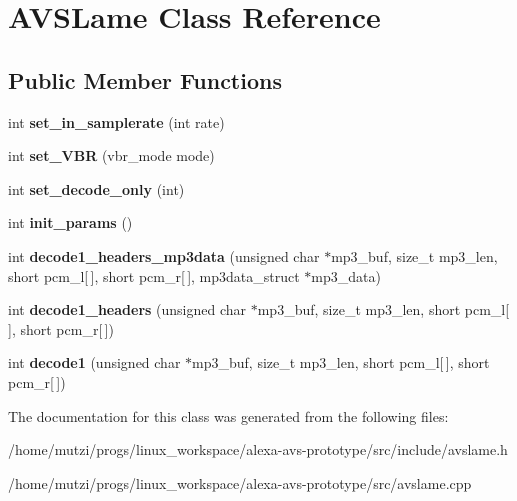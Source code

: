 \hypertarget{classAVSLame}{}\section{A\+V\+S\+Lame Class Reference}
\label{classAVSLame}
\subsection*{Public Member Functions}
\begin{DoxyCompactItemize}
\item 
\mbox{\label{classAVSLame_a2977e3fbc07edbd5e4ff26ce75ec2c3a}} 
int {\bfseries set\+\_\+in\+\_\+samplerate} (int rate)
\item 
\mbox{\label{classAVSLame_afe00737f2c83816810bc9291ed77d3a5}} 
int {\bfseries set\+\_\+\+V\+BR} (vbr\+\_\+mode mode)
\item 
\mbox{\label{classAVSLame_acd6bb2f86cc6ee36af118731f7719899}} 
int {\bfseries set\+\_\+decode\+\_\+only} (int)
\item 
\mbox{\label{classAVSLame_a2accad11b80380e7ca6186ea37ebac07}} 
int {\bfseries init\+\_\+params} ()
\item 
\mbox{\label{classAVSLame_a8bb4dbb0eb60474877d94cd52c6d5a53}} 
int {\bfseries decode1\+\_\+headers\+\_\+mp3data} (unsigned char $\ast$mp3\+\_\+buf, size\+\_\+t mp3\+\_\+len, short pcm\+\_\+l\mbox{[}$\,$\mbox{]}, short pcm\+\_\+r\mbox{[}$\,$\mbox{]}, mp3data\+\_\+struct $\ast$mp3\+\_\+data)
\item 
\mbox{\label{classAVSLame_ab4db8b6f69070c03b0367f60ba2cef77}} 
int {\bfseries decode1\+\_\+headers} (unsigned char $\ast$mp3\+\_\+buf, size\+\_\+t mp3\+\_\+len, short pcm\+\_\+l\mbox{[}$\,$\mbox{]}, short pcm\+\_\+r\mbox{[}$\,$\mbox{]})
\item 
\mbox{\label{classAVSLame_afefc95436db90a56de77f55843e5db22}} 
int {\bfseries decode1} (unsigned char $\ast$mp3\+\_\+buf, size\+\_\+t mp3\+\_\+len, short pcm\+\_\+l\mbox{[}$\,$\mbox{]}, short pcm\+\_\+r\mbox{[}$\,$\mbox{]})
\end{DoxyCompactItemize}


The documentation for this class was generated from the following files\+:\begin{DoxyCompactItemize}
\item 
/home/mutzi/progs/linux\+\_\+workspace/alexa-\/avs-\/prototype/src/include/avslame.\+h\item 
/home/mutzi/progs/linux\+\_\+workspace/alexa-\/avs-\/prototype/src/avslame.\+cpp\end{DoxyCompactItemize}
